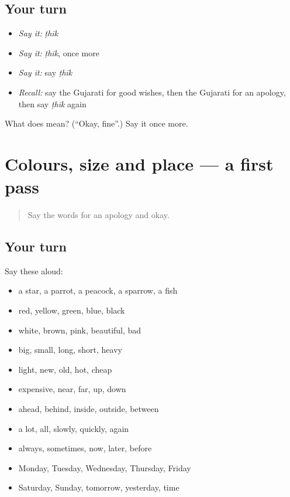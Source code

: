 \subsection*{Your turn}
\begin{itemize}
\raggedright
  \item \emph{Say it:} \emph{ṭhīk}
  \item \emph{Say it:} \emph{ṭhīk}, once more
  \item \emph{Say it:} say \emph{ṭhīk}
  \item \emph{Recall:} say the Gujarati for good wishes, then the Gujarati for an apology, then say \emph{ṭhīk} again
\end{itemize}

\begin{tcolorbox}[breakable,colback=teal!4,colframe=teal!35!black,title={Before you move on}]
What does  mean? (\textquotedblleft{}Okay, fine\textquotedblright{}.) Say it once more.
\end{tcolorbox}
\section[(dialogue)]{Colours, size and place — a first pass}

\label{lesson:GU-R91-first-pass-colours-size-and-place}



\begin{quote}
Say the words for an apology and okay.
\end{quote}

\subsection*{Your turn}
Say these aloud:

\begin{itemize}
\raggedright
  \item a star, a parrot, a peacock, a sparrow, a fish
  \item red, yellow, green, blue, black
  \item white, brown, pink, beautiful, bad
  \item big, small, long, short, heavy
  \item light, new, old, hot, cheap
  \item expensive, near, far, up, down
  \item ahead, behind, inside, outside, between
  \item a lot, all, slowly, quickly, again
  \item always, sometimes, now, later, before
  \item Monday, Tuesday, Wednesday, Thursday, Friday
  \item Saturday, Sunday, tomorrow, yesterday, time
\end{itemize}

